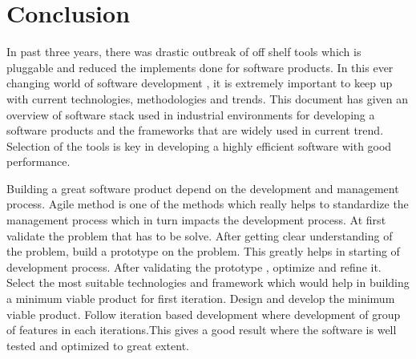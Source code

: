 \chapter{Conclusion}\label{ch:conclusion}

					In past three years, there was drastic outbreak of off shelf tools which is pluggable and reduced the implements done for software products. In this ever changing world of software development , it is extremely important to keep up with current technologies, methodologies and trends. This document has given an overview of software stack used in industrial environments for developing a software products and the frameworks that are widely used in current trend. Selection of the tools  is key in  developing a highly efficient software with good performance.
					
					Building a great software product depend on the development and management process. Agile method is one of the methods which really helps to standardize the management process which in turn impacts the development process. At first validate the problem that has to be solve. After getting clear understanding of the problem, build a prototype on the problem. This greatly helps in starting of development process. After validating the prototype , optimize and refine it. Select the most suitable technologies and framework which would help in building a minimum viable product for first iteration. Design and develop the minimum viable product. Follow iteration based development where development of group of features in each iterations.This gives a good result where the software is well tested and optimized to great extent.  